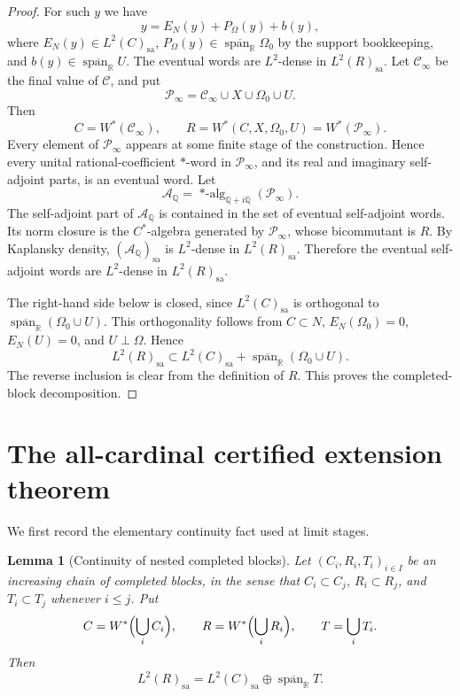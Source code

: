 \documentclass[11pt,letterpaper,reqno]{amsart}
\newtheorem{lem}[thm]{Lemma}
\theoremstyle{definition}
\numberwithin{equation}{section}
\newcommand{\sa}{\mathrm{sa}}
\newcommand{\RR}{\mathbb R}
\DeclareMathOperator{\spanop}{span}
\begin{document}
\begin{proof}
For such $y$ we have
\[
   y=E_N(y)+P_\Omega(y)+b(y),
\]
where $E_N(y)\in L^2(C)_{\sa}$, $P_\Omega(y)\in\overline{\spanop_{\RR}}\Omega_0$ by the support bookkeeping, and $b(y)\in\overline{\spanop_{\RR}}U$. The eventual words are \(L^2\)-dense in \(L^2(R)_{\sa}\).  Let
\(\mathcal C_\infty\) be the final value of \(\mathcal C\), and put
\[
   \mathcal P_\infty=\mathcal C_\infty\cup X\cup\Omega_0\cup U .
\]
Then
\[
   C=W^*(\mathcal C_\infty),
   \qquad
   R=W^*(C,X,\Omega_0,U)=W^*(\mathcal P_\infty).
\]
Every element of \(\mathcal P_\infty\) appears at some finite stage of the
construction.  Hence every unital rational-coefficient \(*\)-word in
\(\mathcal P_\infty\), and its real and imaginary self-adjoint parts, is an
eventual word.  Let
\[
   \mathcal A_{\mathbb Q}
   =
   \operatorname{*-alg}_{\mathbb Q+i\mathbb Q}(\mathcal P_\infty).
\]
The self-adjoint part of \(\mathcal A_{\mathbb Q}\) is contained in the set
of eventual self-adjoint words.  Its norm closure is the \(C^*\)-algebra
generated by \(\mathcal P_\infty\), whose bicommutant is \(R\).  By
Kaplansky density, \((\mathcal A_{\mathbb Q})_{\sa}\) is \(L^2\)-dense in
\(L^2(R)_{\sa}\).  Therefore the eventual self-adjoint words are
\(L^2\)-dense in \(L^2(R)_{\sa}\).

The right-hand side below is closed, since
\(L^2(C)_{\sa}\) is orthogonal to
\(\overline{\spanop_{\RR}}(\Omega_0\cup U)\).  This orthogonality follows from
\(C\subset N\), \(E_N(\Omega_0)=0\), \(E_N(U)=0\), and \(U\perp\Omega\). Hence
\[
   L^2(R)_{\sa}\subset L^2(C)_{\sa}+\overline{\spanop_{\RR}}(\Omega_0\cup U).
\]
The reverse inclusion is clear from the definition of \(R\).  This proves the
completed-block decomposition.
\end{proof}

\section{The all-cardinal certified extension theorem}\label{sec:all-cardinal-extension}

We first record the elementary continuity fact used at limit stages.

\begin{lem}[Continuity of nested completed blocks]\label{lem:nested-limit}
Let $(C_i,R_i,T_i)_{i\in I}$ be an increasing chain of completed blocks, in the sense that $C_i\subset C_j$, $R_i\subset R_j$, and $T_i\subset T_j$ whenever $i\leq j$.  Put
\[
   C=W^*\Bigl(\bigcup_i C_i\Bigr),
   \qquad
   R=W^*\Bigl(\bigcup_i R_i\Bigr),
   \qquad
   T=\bigcup_iT_i.
\]
Then
\[
   L^2(R)_{\sa}=L^2(C)_{\sa}\oplus\overline{\spanop_{\RR}}T.
\]
\end{lem}
\end{document}
